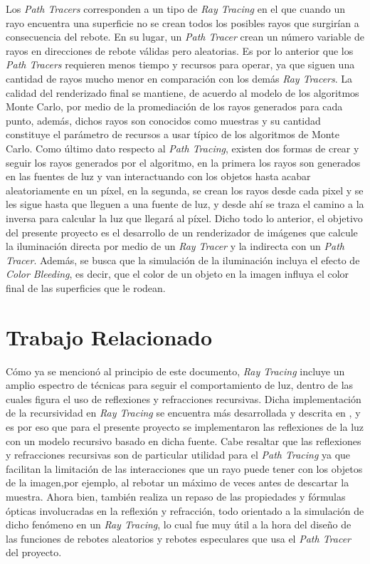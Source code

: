 \documentclass[conference]{IEEEtran}
\begin{document}
Los \textit{Path Tracers} corresponden a un tipo de \textit{Ray Tracing} en el que cuando un rayo encuentra una superficie no se crean todos los posibles rayos que surgirían a consecuencia del rebote. En su lugar, un  \textit{Path Tracer} crean un número variable de rayos en direcciones de rebote válidas pero aleatorias. Es por lo anterior que los \textit{Path Tracers} requieren menos tiempo y recursos para operar, ya que siguen una cantidad de rayos mucho menor en comparación con los demás \textit{Ray Tracers}. La calidad del renderizado final se mantiene, de acuerdo al modelo de los algoritmos Monte Carlo, por medio de la promediación de los rayos generados para cada punto, además, dichos rayos son conocidos como muestras y su cantidad constituye el parámetro de recursos a usar típico de los algoritmos de Monte Carlo. Como último dato respecto al \textit{Path Tracing}, existen dos formas de crear y seguir los rayos generados por el algoritmo, en la primera los rayos son generados en las fuentes de luz y van interactuando con los objetos hasta acabar aleatoriamente en un píxel, en la segunda, se crean los rayos desde cada pixel y se les sigue hasta que lleguen a una fuente de luz, y desde ahí se traza el camino a la inversa para calcular la luz que llegará al píxel. Dicho todo lo anterior, el objetivo del presente proyecto es el desarrollo de un renderizador de imágenes que calcule la iluminación directa por medio de un \textit{Ray Tracer} y la indirecta con un \textit{Path Tracer}. Además, se busca que la simulación de la iluminación incluya el efecto de \textit{Color Bleeding}, es decir, que el color de un objeto en la imagen influya el color final de las superficies que le rodean.

\section{Trabajo Relacionado}

Cómo ya se mencionó al principio de este documento, \textit{Ray Tracing} incluye un amplio espectro de técnicas para seguir el comportamiento de luz, dentro de las cuales figura el uso de reflexiones y refracciones recursivas. Dicha implementación de la recursividad en \textit{Ray Tracing} se encuentra más desarrollada y descrita en \cite{b3}, y es por eso que para el presente proyecto se implementaron las reflexiones de la luz con un modelo recursivo basado en dicha fuente. Cabe resaltar que las reflexiones y refracciones recursivas son de particular utilidad para el \textit{Path Tracing} ya que facilitan la limitación de las interacciones que un rayo puede tener con los objetos de la imagen,por ejemplo, al rebotar un máximo de veces antes de descartar la muestra. Ahora bien, \cite{b3} también realiza un repaso de las propiedades y fórmulas ópticas involucradas en la reflexión y refracción, todo orientado a la simulación de dicho fenómeno en un \textit{Ray Tracing}, lo cual fue muy útil a la hora del diseño de las funciones de rebotes aleatorios y rebotes especulares que usa el \textit{Path Tracer} del proyecto.
\end{document}
